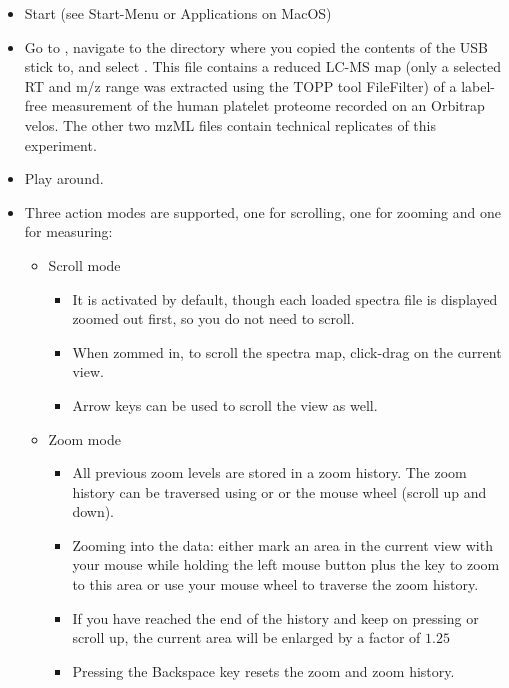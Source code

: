 \begin{itemize}
\item Start  (see Start-Menu or Applications on MacOS)
\item Go to , navigate to the directory where you copied the contents of the USB stick to,
      and select
      . This file contains a reduced LC-MS map (only a selected RT and m/z range
      was extracted using the TOPP tool FileFilter) of a label-free measurement of the human platelet proteome recorded on an Orbitrap velos.
      The other two mzML files contain technical replicates of this experiment.
\item Play around.
\item Three action modes are supported, one for scrolling, one for zooming and one for measuring:
    \begin{itemize}
    \item Scroll mode
        \begin{itemize}
        \item It is activated by default, though each loaded spectra file is displayed zoomed out first, so you do not need to scroll.
        \item When zommed in, to scroll the spectra map, click-drag on the current view.
        \item Arrow keys can be used to scroll the view as well.
        \end{itemize}
    \item Zoom mode
        \begin{itemize}
        \item All previous zoom levels are stored in a zoom history. The zoom history can be traversed using
              \keys[,]{\ctrl,+} or \keys[,]{\ctrl,-} or the mouse wheel (scroll up and down).
        \item Zooming into the data: either mark an area in the current view with your mouse while holding the left mouse
              button plus the \keys{\ctrl} key to zoom to this area
              or use your mouse wheel to traverse the zoom history.
        \item If you have reached the end of the history and keep on pressing \keys[,]{\ctrl,+} or
        			scroll up, the current area will be enlarged by a factor of $1.25$
        \item Pressing the Backspace key resets the zoom and zoom history.
        \end{itemize}

\end{itemize}
\end{itemize}
